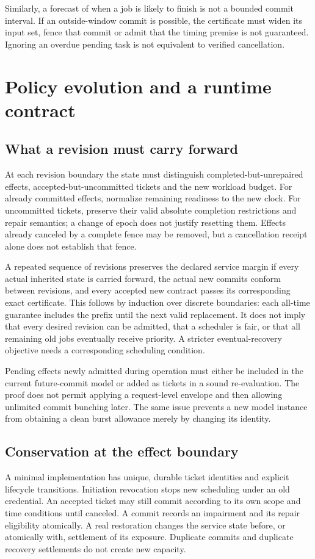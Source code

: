 Similarly, a forecast of when a job is likely to finish is not a bounded commit interval. If an outside-window commit is possible, the certificate must widen its input set, fence that commit or admit that the timing premise is not guaranteed. Ignoring an overdue pending task is not equivalent to verified cancellation.

\section{Policy evolution and a runtime contract}
\label{sec:runtime}
\subsection{What a revision must carry forward}
At each revision boundary the state must distinguish completed-but-unrepaired effects, accepted-but-uncommitted tickets and the new workload budget. For already committed effects, normalize remaining readiness to the new clock. For uncommitted tickets, preserve their valid absolute completion restrictions and repair semantics; a change of epoch does not justify resetting them. Effects already canceled by a complete fence may be removed, but a cancellation receipt alone does not establish that fence.

A repeated sequence of revisions preserves the declared service margin if every actual inherited state is carried forward, the actual new commits conform between revisions, and every accepted new contract passes its corresponding exact certificate. This follows by induction over discrete boundaries: each all-time guarantee includes the prefix until the next valid replacement. It does not imply that every desired revision can be admitted, that a scheduler is fair, or that all remaining old jobs eventually receive priority. A stricter eventual-recovery objective needs a corresponding scheduling condition.

Pending effects newly admitted during operation must either be included in the current future-commit model or added as tickets in a sound re-evaluation. The proof does not permit applying a request-level envelope and then allowing unlimited commit bunching later. The same issue prevents a new model instance from obtaining a clean burst allowance merely by changing its identity.

\subsection{Conservation at the effect boundary}
A minimal implementation has unique, durable ticket identities and explicit lifecycle transitions. Initiation revocation stops new scheduling under an old credential. An accepted ticket may still commit according to its own scope and time conditions until canceled. A commit records an impairment and its repair eligibility atomically. A real restoration changes the service state before, or atomically with, settlement of its exposure. Duplicate commits and duplicate recovery settlements do not create new capacity.

